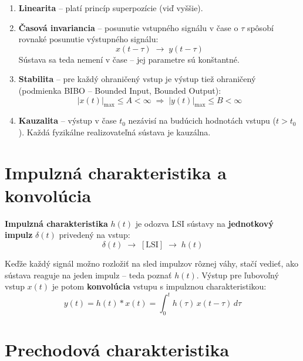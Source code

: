 \begin{enumerate}
  \item \textbf{Linearita} -- platí princíp superpozície (viď vyššie).

  \item \textbf{Časová invariancia} -- posunutie vstupného signálu v čase o $\tau$ spôsobí rovnaké posunutie výstupného signálu:
  \begin{equation}
    x(t-\tau) \;\rightarrow\; y(t-\tau)
  \end{equation}
  Sústava sa teda nemení v čase -- jej parametre sú konštantné.

  \item \textbf{Stabilita} -- pre každý ohraničený vstup je výstup tiež ohraničený (podmienka BIBO -- Bounded Input, Bounded Output):
  \begin{equation}
    |x(t)|_{\max} \leq A < \infty \;\Rightarrow\; |y(t)|_{\max} \leq B < \infty
  \end{equation}

  \item \textbf{Kauzalita} -- výstup v čase $t_0$ nezávisí na budúcich hodnotách vstupu ($t > t_0$). Každá fyzikálne realizovateľná sústava je kauzálna.
\end{enumerate}

\section{Impulzná charakteristika a konvolúcia}

\textbf{Impulzná charakteristika} $h(t)$ je odozva LSI sústavy na \textbf{jednotkový impulz} $\delta(t)$ privedený na vstup:
\begin{equation}
  \delta(t) \;\rightarrow\; [\text{LSI}] \;\rightarrow\; h(t)
\end{equation}

Keďže každý signál možno rozložiť na sled impulzov rôznej váhy, stačí vedieť, ako sústava reaguje na jeden impulz -- teda poznať $h(t)$. Výstup pre ľubovoľný vstup $x(t)$ je potom \textbf{konvolúcia} vstupu s impulznou charakteristikou:
\begin{equation}
  y(t) = h(t) * x(t) = \int_0^{t} h(\tau)\,x(t-\tau)\,d\tau
\end{equation}

\section{Prechodová charakteristika}

